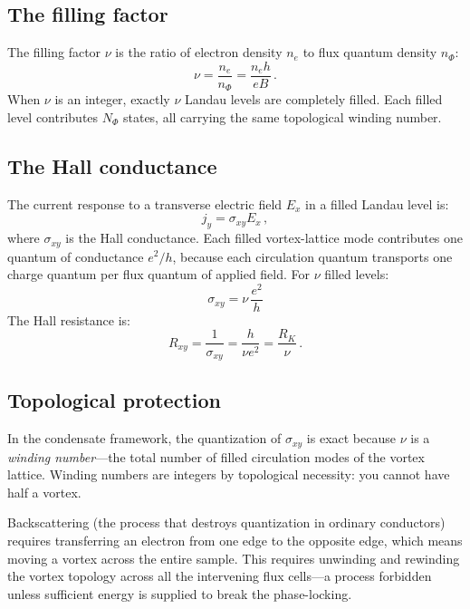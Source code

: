 \documentclass[12pt, a4paper]{article}
\begin{document}
\subsection{The filling factor}

The filling factor $\nu$ is the ratio of electron
density $n_e$ to flux quantum density $n_\Phi$:
\begin{equation}
    \nu = \frac{n_e}{n_\Phi}
    = \frac{n_e h}{eB}\,.
\label{eq:filling}
\end{equation}
When $\nu$ is an integer, exactly $\nu$ Landau levels
are completely filled. Each filled level contributes
$N_\Phi$ states, all carrying the same topological
winding number.

\subsection{The Hall conductance}

The current response to a transverse electric field
$E_x$ in a filled Landau level is:
\begin{equation}
    j_y = \sigma_{xy} E_x\,,
\label{eq:hall_current}
\end{equation}
where $\sigma_{xy}$ is the Hall conductance. Each
filled vortex-lattice mode contributes one quantum
of conductance $e^2/h$, because each circulation
quantum transports one charge quantum per flux
quantum of applied field. For $\nu$ filled levels:
\begin{equation}
    \boxed{\;\sigma_{xy} = \nu\,\frac{e^2}{h}\;}
\label{eq:sigma_xy}
\end{equation}
The Hall resistance is:
\begin{equation}
    R_{xy} = \frac{1}{\sigma_{xy}}
    = \frac{h}{\nu e^2}
    = \frac{R_K}{\nu}\,.
\label{eq:R_xy}
\end{equation}

\subsection{Topological protection}

In the condensate framework, the quantization of
$\sigma_{xy}$ is exact because $\nu$ is a
\emph{winding number}---the total number of filled
circulation modes of the vortex lattice. Winding
numbers are integers by topological necessity:
you cannot have half a vortex.

Backscattering (the process that destroys
quantization in ordinary conductors) requires
transferring an electron from one edge to the
opposite edge, which means moving a vortex across
the entire sample. This requires unwinding and
rewinding the vortex topology across all the
intervening flux cells---a process forbidden unless
sufficient energy is supplied to break the
phase-locking.
\end{document}
